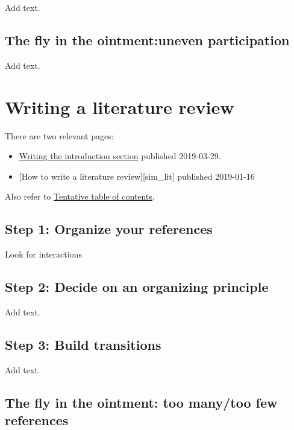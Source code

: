 \documentclass[
  letterpaper,
  DIV=11,
  numbers=noendperiod]{scrreprt}
\providecommand{\tightlist}{%
  \setlength{\itemsep}{0pt}\setlength{\parskip}{0pt}}\usepackage{longtable,booktabs,array}
\begin{document}
Add text.

\section{The fly in the ointment:uneven
participation}\label{the-fly-in-the-ointmentuneven-participation}

Add text.


\chapter{Writing a literature review}\label{writing-a-literature-review}

There are two relevant pages:

\begin{itemize}
\tightlist
\item
  \href{http://new.pmean.com/introduction-section/}{Writing the
  introduction section} published 2019-03-29.
\item
  {[}How to write a literature review{]}{[}sim\_lit{]} published
  2019-01-16
\end{itemize}

Also refer to \href{http://www.pmean.com/10/Contents.html}{Tentative
table of contents}.

\section{Step 1: Organize your
references}\label{step-1-organize-your-references}

Look for interactions

\section{Step 2: Decide on an organizing
principle}\label{step-2-decide-on-an-organizing-principle}

Add text.

\section{Step 3: Build transitions}\label{step-3-build-transitions}

Add text.

\section{The fly in the ointment: too many/too few
references}\label{the-fly-in-the-ointment-too-manytoo-few-references}
\end{document}
